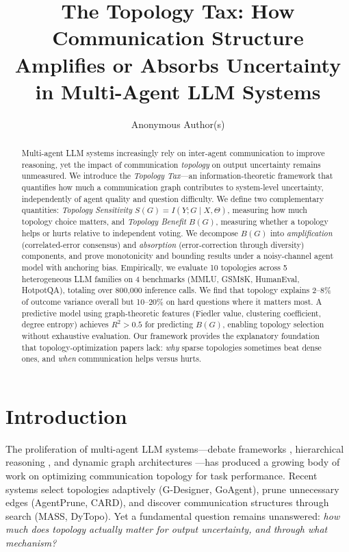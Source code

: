\documentclass{article}
\title{The Topology Tax: How Communication Structure Amplifies or Absorbs Uncertainty in Multi-Agent LLM Systems}
\author{%
  Anonymous Author(s)
}
\begin{document}
\maketitle

\begin{abstract}
Multi-agent LLM systems increasingly rely on inter-agent communication to improve reasoning, yet the impact of communication \emph{topology} on output uncertainty remains unmeasured. We introduce the \emph{Topology Tax}---an information-theoretic framework that quantifies how much a communication graph contributes to system-level uncertainty, independently of agent quality and question difficulty. We define two complementary quantities: \emph{Topology Sensitivity} $S(G) = I(Y; G \mid X, \Theta)$, measuring how much topology choice matters, and \emph{Topology Benefit} $B(G)$, measuring whether a topology helps or hurts relative to independent voting. We decompose $B(G)$ into \emph{amplification} (correlated-error consensus) and \emph{absorption} (error-correction through diversity) components, and prove monotonicity and bounding results under a noisy-channel agent model with anchoring bias. Empirically, we evaluate 10 topologies across 5 heterogeneous LLM families on 4 benchmarks (MMLU, GSM8K, HumanEval, HotpotQA), totaling over 800{,}000 inference calls. We find that topology explains 2--8\% of outcome variance overall but 10--20\% on hard questions where it matters most. A predictive model using graph-theoretic features (Fiedler value, clustering coefficient, degree entropy) achieves $R^2 > 0.5$ for predicting $B(G)$, enabling topology selection without exhaustive evaluation. Our framework provides the explanatory foundation that topology-optimization papers lack: \emph{why} sparse topologies sometimes beat dense ones, and \emph{when} communication helps versus hurts.
\end{abstract}

\section{Introduction}
\label{sec:intro}

The proliferation of multi-agent LLM systems---debate frameworks \citep{du2023improving,liang2024encouraging}, hierarchical reasoning \citep{chen2024reconcile}, and dynamic graph architectures \citep{zhuge2024gptswarm,liu2024dynamic}---has produced a growing body of work on optimizing communication topology for task performance. Recent systems select topologies adaptively (G-Designer, GoAgent), prune unnecessary edges (AgentPrune, CARD), and discover communication structures through search (MASS, DyTopo). Yet a fundamental question remains unanswered: \emph{how much does topology actually matter for output uncertainty, and through what mechanism?}
\end{document}
